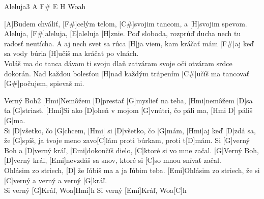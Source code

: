 \documentclass[12pt]{article}
\begin{document}
\begin{song}{Aleluja}{3}
	A F\# E H Woah
	
	[A]Budem chváliť, 
	[F#]celým telom,
	[C#]svojim tancom,
	a [H]svojim spevom.
	\\
	[A]Aleluja, [F#]aleluja, 
	[E]aleluja [H]znie.
	Poď sloboda, rozprúď ducha
	nech tu radosť neutícha.
	\columnbreak
	[F#]A aj nech svet sa rúca
	[H]ja viem, kam kráčať mám
	[F#]aj keď sa vody búria
	[H]učíš ma kráčať po vlnách.
	\\
	Voláš ma do tanca
	dávam ti svoju dlaň
	zatváram svoje oči
	otváram srdce dokorán.
	\columnbreak
	[A]Nad každou bolesťou
	[H]nad každým trápením
	[C#]učíš ma tancovať
	[G#]počujem, spievaš mi.
\end{song}

\begin{song}{Verný Boh}{2}
	[Hmi]Nemôžem [D]prestať [G]myslieť na teba,
	[Hmi]nemôžem [D]sa ťa [G]striasť.
	[Hmi]Si ako [D]oheň v mojom [G]vnútri, čo páli ma,
	[Hmi D] páliš [G]ma.
	\\
	[Hmi] Si [D]všetko, čo [G]chcem,
	[Hmi] si [D]všetko, čo [G]mám,
	[Hmi]aj keď [D]zdá sa, že [G]spíš, 
	ja tvoje meno zavo[C]lám
	proti búrkam, proti t[D]mám.
	\columnbreak
	Si [G]verný Boh a [D]verný kráľ,
	[Emi]dokončíš dielo, [C]ktoré si vo mne začal.
	[G]Verný Boh, [D]verný kráľ, [Emi]nevzdáš sa snov, 
	ktoré si [C]so mnou snívať začal.
	\\
	[G]Ohlásim zo striech,
	[D] že ľúbiš ma a ja ľúbim teba.
	[Emi]Ohlásim zo striech,
	že si [C]verný a verný a verný [G]kráľ.
	\\
	Si verný [G]Kráľ, Woa[Hmi]h
	Si verný [Emi]Kráľ, Woa[C]h
\end{song}
\end{document}

